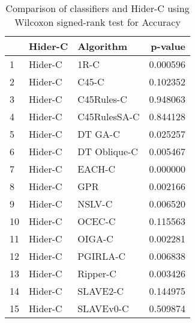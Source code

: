 \begin{table}
\footnotesize
\caption{Comparison of classifiers and Hider-C using Wilcoxon signed-rank test for Accuracy}
\label{tab:Hider-C wilcoxon Accuracy comparison}
\begin{tabular}{lllr}
\hline
 & Hider-C & Algorithm & p-value \\
\hline
1 & Hider-C & 1R-C & 0.000596 \\
2 & Hider-C & C45-C & 0.102352 \\
3 & Hider-C & C45Rules-C & 0.948063 \\
4 & Hider-C & C45RulesSA-C & 0.844128 \\
5 & Hider-C & DT GA-C & 0.025257 \\
6 & Hider-C & DT Oblique-C & 0.005467 \\
7 & Hider-C & EACH-C & 0.000000 \\
8 & Hider-C & GPR & 0.002166 \\
9 & Hider-C & NSLV-C & 0.006520 \\
10 & Hider-C & OCEC-C & 0.115563 \\
11 & Hider-C & OIGA-C & 0.002281 \\
12 & Hider-C & PGIRLA-C & 0.006838 \\
13 & Hider-C & Ripper-C & 0.003426 \\
14 & Hider-C & SLAVE2-C & 0.144975 \\
15 & Hider-C & SLAVEv0-C & 0.509874 \\
\hline
\end{tabular}
\end{table}
